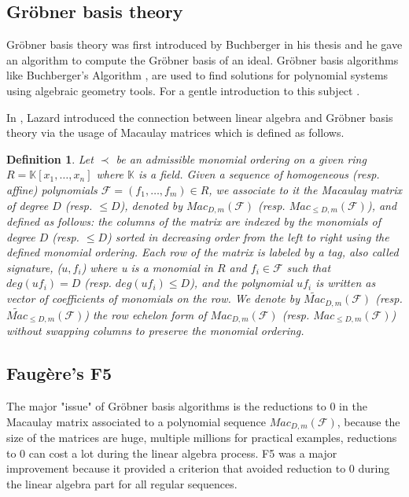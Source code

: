 \documentclass[english]{article}
\newtheorem{definition}{Definition}[section]
\newcommand{\Mac}[3]{{Mac_{#1, #2}(\mathcal{#3})}}
\newcommand{\Mact}[3]{{\widetilde{Mac}_{#1, #2}(\mathcal{#3})}}
\begin{document}
		\subsection{Gröbner basis theory}
		Gröbner basis theory was first introduced by Buchberger in his thesis \cite{Buc} and he gave an algorithm to compute the Gröbner basis of an ideal.
		Gröbner basis algorithms like Buchberger's Algorithm \cite{Buc}, are used to find solutions for polynomial systems using algebraic geometry tools. For a gentle introduction to this subject \cite{CLS}.
		
		In \cite{Lazard83}, Lazard introduced the connection between linear algebra and Gröbner basis theory via the usage of Macaulay matrices \cite{Mac} which is defined as follows.
		
		\begin{definition}
			Let $\prec$ be an admissible monomial ordering on a given ring $R = \mathbb{K}[x_1,\dots,x_n]$ where $\mathbb{K}$ is a field. Given a sequence of homogeneous (resp. affine) polynomials $\mathcal{F} = (f_1,\dots,f_m) \in R$, we associate to it the Macaulay matrix of degree $D$ (resp. $\leq D$), denoted by $\Mac{D}{m}{\mathcal{F}}$ (resp. $\Mac{\leq D}{m}{\mathcal{F}}$), and defined as follows: the columns of the matrix are indexed by the monomials of degree $D$ (resp. $\leq D$) sorted in decreasing order from the left to right using the defined monomial ordering. Each row of the matrix is labeled by a tag, also called signature, ($u, f_i$) where u is a monomial in $R$ and $f_i \in \mathcal{F}$ such that $deg(uf_i) = D$ (resp. $deg(uf_i) \leq D$), and the polynomial $uf_i$ is written as vector of coefficients of monomials on the row. We denote by $\Mact{D}{m}{F}$ (resp. $\Mact{\leq D}{m}{F}$) the row echelon form of $\Mac{D}{m}{\mathcal{F}}$ (resp. $\Mac{\leq D}{m}{\mathcal{F}}$) without swapping columns to preserve the monomial ordering.
		\end{definition}
		
		\subsection{Faugère's F5}
		
		The major "issue" of Gröbner basis algorithms is the reductions to 0 in the Macaulay matrix associated to a polynomial sequence $\Mac{D}{m}{F}$, because the size of the matrices are huge, multiple millions for practical examples,
		reductions to 0 can cost a lot during the linear algebra process. F5 \cite{F02} was a major improvement because it provided a criterion that avoided reduction to 0 during the linear algebra part for all regular sequences.
		
\end{document}
